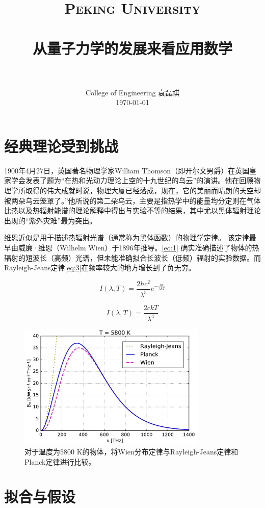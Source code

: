 \documentclass[12pt]{article}
\title{
		\vspace{-1in} 	
		\usefont{OT1}{bch}{b}{n}
		\normalfont \normalsize \textsc{\LARGE Peking University}\\[1cm] %
		\horrule{0.5pt} \\[0.5cm]
		\huge \bfseries{从量子力学的发展来看应用数学} \\
		\horrule{2pt} \\[0.5cm]
}
\author{
		\normalfont 								\normalsize
		College of Engineering \quad 2001111690  \quad 袁磊祺\\	\normalsize
        \today
}
\date{}
\begin{document}


\maketitle

\section{经典理论受到挑战}

1900年4月27日，英国著名物理学家William Thomson（即开尔文男爵）在英国皇家学会发表了题为“在热和光动力理论上空的十九世纪的乌云”的演讲。他在回顾物理学所取得的伟大成就时说，物理大厦已经落成，现在，它的美丽而晴朗的天空却被两朵乌云笼罩了。”他所说的第二朵乌云，主要是指热学中的能量均分定则在气体比热以及热辐射能谱的理论解释中得出与实验不等的结果，其中尤以黑体辐射理论出现的“紫外灾难”最为突出。

维恩近似是用于描述热辐射光谱（通常称为黑体函数）的物理学定律。 该定律最早由威廉·维恩（Wilhelm Wien）于1896年推导。\cref{eq:1} 确实准确描述了物体的热辐射的短波长（高频）光谱，但未能准确拟合长波长（低频）辐射的实验数据。而Rayleigh-Jeans定律\cref{eq:3}在频率较大的地方增长到了负无穷。

\begin{equation}
	I(\lambda, T) = \frac{2 h c^2} {\lambda^5} e^{-\frac{hc}{\lambda kT}}
	\label{eq:1}
\end{equation}

\begin{equation}
	I(\lambda, T)= \frac{2 ckT}{\lambda^4}
	\label{eq:3}
\end{equation}

\begin{figure}[htp]
	\centering
	\includegraphics[width=9cm]{1}
	\caption{对于温度为5800 K的物体，将Wien分布定律与Rayleigh-Jeans定律和Planck定律进行比较。}
	\label{fig:1}
\end{figure}

\section{拟合与假设}
\end{document}
